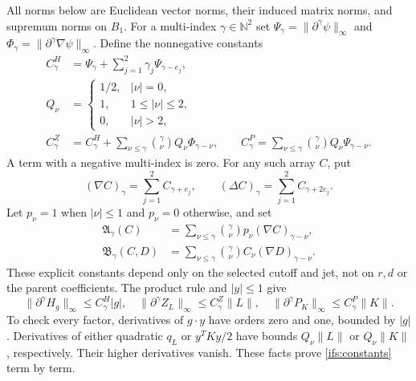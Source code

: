 All norms below are Euclidean vector norms, their induced matrix
norms, and supremum norms on $B_1$.
For a multi-index $\gamma\in\mathbb N^2$ set
$\Psi_\gamma=\|\partial^\gamma\psi\|_\infty$ and
$\Phi_\gamma=\|\partial^\gamma\nabla\psi\|_\infty$.
Define the nonnegative constants
\begin{align}
 C^H_\gamma&=\Psi_\gamma+\sum_{j=1}^2
                        \gamma_j\Psi_{\gamma-e_j},\nonumber\\
 Q_\nu&=
 \begin{cases}
 1/2,&|\nu|=0,\\
 1,&1\leq|\nu|\leq2,\\
 0,&|\nu|>2,
 \end{cases}\nonumber\\
 C^Z_\gamma&=C^H_\gamma+
       \sum_{\nu\leq\gamma}\binom\gamma\nu Q_\nu\Phi_{\gamma-\nu},
 \qquad
 C^P_\gamma=\sum_{\nu\leq\gamma}
                   \binom\gamma\nu Q_\nu\Psi_{\gamma-\nu}.
 \label{ifs:constants}
\end{align}
A term with a negative multi-index is zero.
For any such array $C$, put
\[
 (\nabla C)_\gamma=\sum_{j=1}^2 C_{\gamma+e_j},\qquad
 (\Delta C)_\gamma=\sum_{j=1}^2 C_{\gamma+2e_j}.
\]
Let $p_\nu=1$ when $|\nu|\leq1$ and $p_\nu=0$ otherwise, and set
\begin{align}
 \mathfrak A_\gamma(C)
 &=\sum_{\nu\leq\gamma}\binom\gamma\nu
                         p_\nu(\nabla C)_{\gamma-\nu},\nonumber\\
 \mathfrak B_\gamma(C,D)
 &=\sum_{\nu\leq\gamma}\binom\gamma\nu
                         C_\nu(\nabla D)_{\gamma-\nu}.
 \label{ifs:product-constants}
\end{align}
These explicit constants depend only on the selected cutoff and jet,
not on $r,d$ or the parent coefficients.
The product rule and $|y|\leq1$ give
\begin{equation}\label{ifs:linear-map-bounds}
 \|\partial^\gamma H_g\|_\infty\leq C^H_\gamma|g|,
 \quad
 \|\partial^\gamma Z_L\|_\infty\leq C^Z_\gamma\|L\|,
 \quad
 \|\partial^\gamma P_K\|_\infty\leq C^P_\gamma\|K\|.
\end{equation}
To check every factor, derivatives of $g\cdot y$ have orders zero
and one, bounded by $|g|$.  Derivatives of either quadratic
$q_L$ or $y^TKy/2$ have bounds $Q_\nu\|L\|$ or
$Q_\nu\|K\|$, respectively.  Their higher derivatives vanish.
These facts prove \eqref{ifs:constants} term by term.

